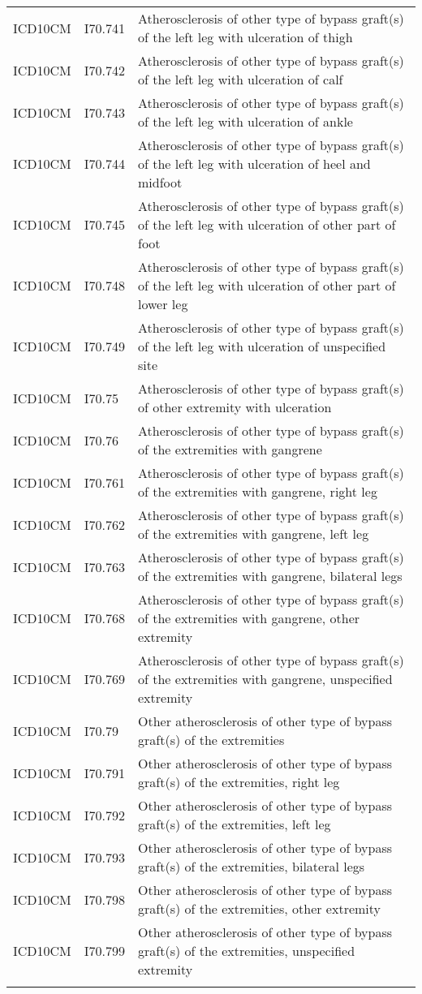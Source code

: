 \begin{longtable}{p{}p{}p{}}
  ICD10CM & I70.741 & Atherosclerosis of other type of bypass graft(s) of the left leg with ulceration of thigh \\ 
  ICD10CM & I70.742 & Atherosclerosis of other type of bypass graft(s) of the left leg with ulceration of calf \\ 
  ICD10CM & I70.743 & Atherosclerosis of other type of bypass graft(s) of the left leg with ulceration of ankle \\ 
  ICD10CM & I70.744 & Atherosclerosis of other type of bypass graft(s) of the left leg with ulceration of heel and midfoot \\ 
  ICD10CM & I70.745 & Atherosclerosis of other type of bypass graft(s) of the left leg with ulceration of other part of foot \\ 
  ICD10CM & I70.748 & Atherosclerosis of other type of bypass graft(s) of the left leg with ulceration of other part of lower leg \\ 
  ICD10CM & I70.749 & Atherosclerosis of other type of bypass graft(s) of the left leg with ulceration of unspecified site \\ 
  ICD10CM & I70.75 & Atherosclerosis of other type of bypass graft(s) of other extremity with ulceration \\ 
  ICD10CM & I70.76 & Atherosclerosis of other type of bypass graft(s) of the extremities with gangrene \\ 
  ICD10CM & I70.761 & Atherosclerosis of other type of bypass graft(s) of the extremities with gangrene, right leg \\ 
  ICD10CM & I70.762 & Atherosclerosis of other type of bypass graft(s) of the extremities with gangrene, left leg \\ 
  ICD10CM & I70.763 & Atherosclerosis of other type of bypass graft(s) of the extremities with gangrene, bilateral legs \\ 
  ICD10CM & I70.768 & Atherosclerosis of other type of bypass graft(s) of the extremities with gangrene, other extremity \\ 
  ICD10CM & I70.769 & Atherosclerosis of other type of bypass graft(s) of the extremities with gangrene, unspecified extremity \\ 
  ICD10CM & I70.79 & Other atherosclerosis of other type of bypass graft(s) of the extremities \\ 
  ICD10CM & I70.791 & Other atherosclerosis of other type of bypass graft(s) of the extremities, right leg \\ 
  ICD10CM & I70.792 & Other atherosclerosis of other type of bypass graft(s) of the extremities, left leg \\ 
  ICD10CM & I70.793 & Other atherosclerosis of other type of bypass graft(s) of the extremities, bilateral legs \\ 
  ICD10CM & I70.798 & Other atherosclerosis of other type of bypass graft(s) of the extremities, other extremity \\ 
  ICD10CM & I70.799 & Other atherosclerosis of other type of bypass graft(s) of the extremities, unspecified extremity \\ 
  \hline
\label{tab:codes_pad}
\end{longtable}
